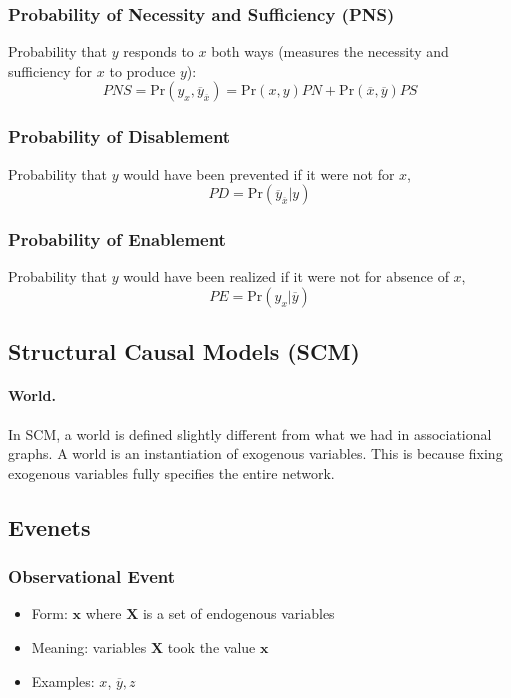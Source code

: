 \documentclass[11pt]{article}
\newcommand{\bx}{\mathbf{x}}
\newcommand{\pr}{\mathrm{Pr}}
\begin{document}
\subsubsection{Probability of Necessity and Sufficiency (PNS)}
Probability that $y$ responds to $x$ both ways (measures the necessity and sufficiency for $x$ to produce $y$): 
\begin{equation}
	PNS = \pr (y_x, \overbar y_{\overbar x} ) = \pr (x, y) PN + \pr (\overbar x, \overbar y) PS
\end{equation}

\subsubsection{Probability of Disablement} Probability that $y$ would have been prevented if it were not for $x$, 
\begin{equation}
	PD = \pr (\overbar y _ {\overbar x} | y )
\end{equation}

\subsubsection{Probability of Enablement} Probability that $y$ would have been realized if it were not for absence of $x$, 
\begin{equation}
	PE = \pr (y_x | \overbar y) 
\end{equation}


\subsection{Structural Causal Models (SCM)}

\paragraph{World.} In SCM, a world is defined slightly different from what we had in associational graphs. A world is an instantiation of exogenous variables. This is because fixing exogenous variables fully specifies the entire network. 

\subsection{Evenets}
\subsubsection{Observational Event}
\begin{itemize}
	\item Form: $\bx$ where $\mathbf X$ is a set of endogenous variables
	\item Meaning: variables $\mathbf X$ took the value $\bx$
	\item Examples: $x$, \quad $\overbar y, z$
\end{itemize}
\end{document}

